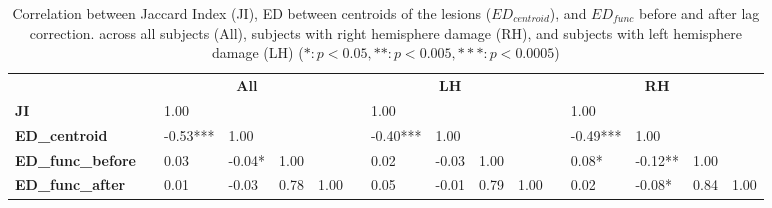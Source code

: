 \documentclass[fleqn,10pt]{wlscirep}
\begin{document}
\begin{table}[]
{\begin{tabular}{@{}llllllllllllllll@{}}
\cmidrule(r){1-1} \cmidrule(lr){3-6} \cmidrule(lr){8-11} \cmidrule(l){13-16}
                          &  &          & \multicolumn{1}{c}{\textbf{All}} & \multicolumn{1}{c}{\textbf{}} & \multicolumn{1}{c}{\textbf{}} & \multicolumn{1}{c}{\textbf{}} & \multicolumn{1}{c}{\textbf{}} & \multicolumn{1}{c}{\textbf{LH}} & \multicolumn{1}{c}{\textbf{}} & \multicolumn{1}{c}{\textbf{}} & \multicolumn{1}{c}{\textbf{}} & \multicolumn{1}{c}{\textbf{}} & \multicolumn{1}{c}{\textbf{RH}} & \multicolumn{1}{c}{\textbf{}} & \multicolumn{1}{c}{\textbf{}} \\ \cmidrule(r){1-1} \cmidrule(lr){3-6} \cmidrule(lr){8-11} \cmidrule(l){13-16} 
\textbf{JI}               &  & 1.00     &                                 &                               &                               &                               & 1.00                          &                                 &                               &                               &                               & 1.00                          &                                 &                               &                               \\
\textbf{ED\_centroid}     &  & -0.53*** & 1.00                            &                               &                               &                               & -0.40***                      & 1.00                            &                               &                               &                               & -0.49***                      & 1.00                            &                               &                               \\
\textbf{ED\_func\_before} &  & 0.03     & -0.04*                          & 1.00                          &                               &                               & 0.02                          & -0.03                           & 1.00                          &                               &                               & 0.08*                         & -0.12**                         & 1.00                          &                               \\
\textbf{ED\_func\_after}  &  & 0.01     & -0.03                           & 0.78                          & 1.00                          &                               & 0.05                          & -0.01                           & 0.79                          & 1.00                          &                               & 0.02                          & -0.08*                          & 0.84                          & 1.00                          \\ \cmidrule(r){1-1} \cmidrule(lr){3-6} \cmidrule(lr){8-11} \cmidrule(l){13-16} 
\end{tabular}}
\caption{Correlation between Jaccard Index (JI), ED between centroids of the lesions ($\textit{ED}_{{centroid}}$), and $\textit{ED}_{{func}}$ before and after lag correction. across  all subjects (All), subjects with right hemisphere damage (RH), and subjects with left hemisphere damage (LH) ($*: p<0.05, **: p<0.005, ***: p<0.0005 $)}
\label{tbl:EDcentroid}
\end{table}
\end{document}
